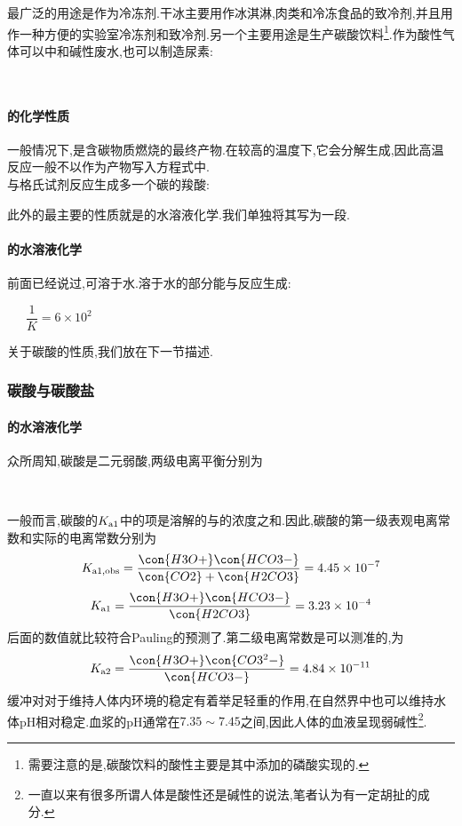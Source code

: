 \documentclass[draft]{ctexart}
\begin{document}
\indent {}最广泛的用途是作为冷冻剂.干冰主要用作冰淇淋,肉类和冷冻食品的致冷剂,并且用作一种方便的实验室冷冻剂和致冷剂.另一个主要用途是生产碳酸饮料\footnote{需要注意的是,碳酸饮料的酸性主要是其中添加的磷酸实现的.}.作为酸性气体可以中和碱性废水,也可以制造尿素:
\begin{center}
    \\
\end{center}
\paragraph{的化学性质}
一般情况下,是含碳物质燃烧的最终产物.在较高的温度下,它会分解生成,因此高温反应一般不以作为产物写入方程式中.\\
\indent {}与格氏试剂反应生成多一个碳的羧酸:
\begin{center}
\end{center}

\indent 此外的最主要的性质就是的水溶液化学.我们单独将其写为一段.
\paragraph{的水溶液化学}
前面已经说过,可溶于水.溶于水的部分能与反应生成:
\begin{center}
    \ \ \ $\dfrac{1}{K}=6\times10^2$
\end{center}
关于碳酸的性质,我们放在下一节描述.
\subsubsection{碳酸与碳酸盐}
\paragraph{的水溶液化学}
众所周知,碳酸是二元弱酸,两级电离平衡分别为
\begin{center}
    \\
\end{center}
一般而言,碳酸的$K_{\text a1}$中的\ce{[H2CO3]}项是溶解的与的浓度之和.因此,碳酸的第一级表观电离常数和实际的电离常数分别为
\[K_{\text{a}1,\text{obs}}=\dfrac{\con{H3O+}\con{HCO3-}}{\con{CO2}+\con{H2CO3}}=4.45\times10^{-7}\]
\[K_{\text a1}=\dfrac{\con{H3O+}\con{HCO3-}}{\con{H2CO3}}=3.23\times10^{-4}\]
后面的数值就比较符合Pauling的预测了.第二级电离常数是可以测准的,为
\[K_{\text a2}=\dfrac{\con{H3O+}\con{CO3^2-}}{\con{HCO3-}}=4.84\times10^{-11}\]
缓冲对对于维持人体内环境的稳定有着举足轻重的作用,在自然界中也可以维持水体pH相对稳定.血浆的pH通常在$7.35\sim7.45$之间,因此人体的血液呈现弱碱性\footnote{一直以来有很多所谓人体是酸性还是碱性的说法,笔者认为有一定胡扯的成分.}.
\end{document}
